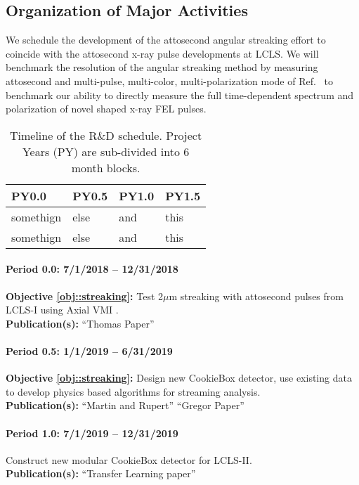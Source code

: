 \subsection*{Organization of Major Activities}

We schedule the development of the attosecond angular streaking effort to coincide with the attosecond x-ray pulse developments at LCLS.
We will benchmark the resolution of the angular streaking method by measuring attosecond and multi-pulse, multi-color, multi-polarization mode of Ref.~\cite{Lutman2016} to benchmark our ability to directly measure the full time-dependent spectrum and polarization of novel shaped x-ray FEL pulses.


\begin{table}
\caption{\label{tab::schedule} Timeline of the R\&D schedule. Project Years (PY) are sub-divided into 6 month blocks. }
\begin{tabular}{l|l|l|l}
\hline
PY0.0 & PY0.5 & PY1.0 & PY1.5\\
\hline
somethign & else& and & this\\
somethign & else& and & this\\
\end{tabular}
\end{table}


\paragraph*{Period 0.0: 7/1/2018 -- 12/31/2018\\}
\textbf{Objective \ref{obj::streaking}: }
Test 2$\mu$m streaking with attosecond pulses from LCLS-I using Axial VMI \cite{Siqi2018}.\\
\textbf{Publication(s): }
``Thomas Paper''

\paragraph*{Period 0.5: 1/1/2019 -- 6/31/2019\\}
\textbf{Objective \ref{obj::streaking}: }
Design new CookieBox detector, use existing data to develop physics based algorithms for streaming analysis.\\
\textbf{Publication(s): }
``Martin and Rupert''
``Gregor Paper''

\paragraph*{Period 1.0: 7/1/2019 -- 12/31/2019\\}
Construct new modular CookieBox detector for LCLS-II.\\
\textbf{Publication(s): }
``Transfer Learning paper''

